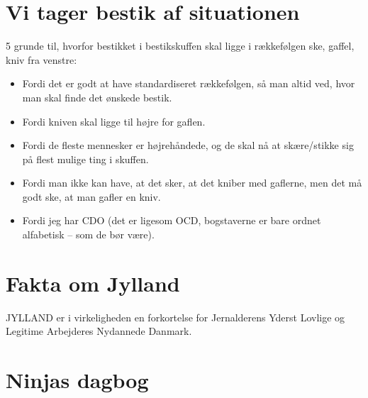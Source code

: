

\begin{minipage}[b]{0.95\linewidth}
\begin{minipage}[t]{0.47\textwidth}
\vspace{1mm}
\section*{Vi tager bestik af situationen}

5 grunde til, hvorfor bestikket i bestikskuffen skal ligge i rækkefølgen ske, gaffel, kniv fra venstre:

\begin{itemize}
\item Fordi det er godt at have standardiseret rækkefølgen, så man altid ved, hvor man skal finde det ønskede bestik.
\item Fordi kniven skal ligge til højre for gaflen.
\item Fordi de fleste mennesker er højrehåndede, og de skal nå at skære/stikke sig på flest mulige ting i skuffen.
\item Fordi man ikke kan have, at det sker, at det kniber med gaflerne, men det må godt ske, at man gafler en kniv.
\item Fordi jeg har CDO (det er ligesom OCD, bogstaverne er bare ordnet alfabetisk – som de bør være).
\end{itemize}

\vspace{-7mm}

\section*{Fakta om Jylland}
JYLLAND er i virkeligheden en forkortelse for Jernalderens Yderst Lovlige og Legitime Arbejderes Nydannede Danmark.

\vspace{-3mm}

\section*{Ninjas dagbog}


\end{minipage}
\end{minipage}
